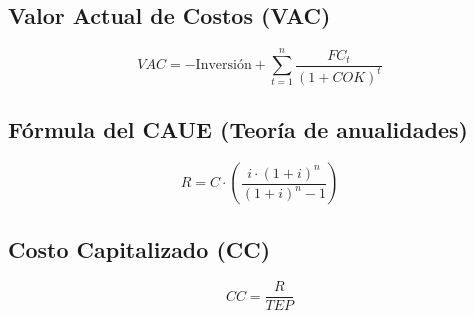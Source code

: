 \documentclass[a4paper, twocolumn]{article}
\begin{document}
\subsection{Valor Actual de Costos (VAC)}

$$ VAC = - \text{Inversión} + \sum_{t = 1}^{n} \frac{FC_t}{(1 + COK)^t} $$

\subsection{Fórmula del CAUE (Teoría de anualidades)}

$$ R = C \cdot (\frac{i \cdot (1 + i)^n}{(1 + i)^n - 1}) $$

\subsection{Costo Capitalizado (CC)}

$$ CC = \frac{R}{TEP} $$
\end{document}
